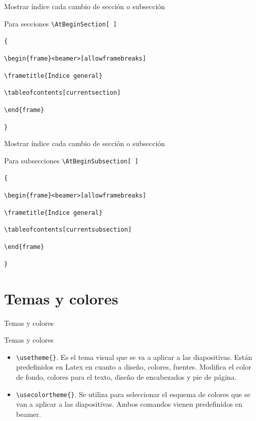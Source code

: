 \documentclass[aspectratio=169, 10pt]{beamer}
\begin{document}
\begin{frame}[fragile]{Mostrar índice cada cambio de sección o subsección}
    \begin{exampleblock}{Para secciones} \pause
    \verb|\AtBeginSection[ ]| \pause
    
        \verb|{|  \pause
        
        \verb|\begin{frame}<beamer>[allowframebreaks]| \pause

            \verb|\frametitle{Índice general}| \pause

        
                \verb|\tableofcontents[currentsection]| \pause
        
        \verb|\end{frame}| \pause
                
        \verb|}|
    \end{exampleblock}
    
\end{frame}


\begin{frame}[fragile]{Mostrar índice cada cambio de sección o subsección}
    \begin{exampleblock}{Para subsecciones} \pause
\verb|\AtBeginSubsection[ ]| \pause
    
        \verb|{| \pause
        
        \verb|\begin{frame}<beamer>[allowframebreaks]| \pause

            \verb|\frametitle{Índice general}| \pause

        
                \verb|\tableofcontents[currentsubsection]| \pause
        
        \verb|\end{frame}| \pause
                
        \verb|}| 
    \end{exampleblock}
    
\end{frame}

\section{Temas y colores}
\begin{frame}[fragile]{Temas y colores}
    \begin{block}{Temas y colores} \pause
        \begin{itemize}
            \item \verb|\usetheme{}|. Es el tema visual que se va a aplicar a las diapositivas. Están predefinidos en Latex en cuanto a diseño, colores, fuentes. Modifica el color de fondo, colores para el texto, diseño de encabezados y pie de página. \pause
            \item \verb|\usecolortheme{}|. Se utiliza para seleccionar el esquema de colores que se van a aplicar a las diapositivas. Ambos comandos vienen predefinidos en beamer. 
        \end{itemize}
        
    \end{block}
\end{frame}
\end{document}
